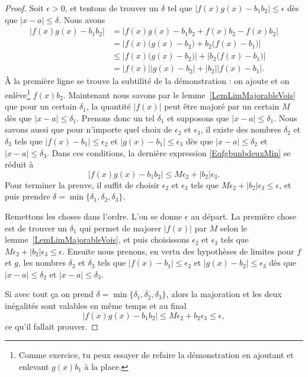 \begin{proof}
	Soit $\epsilon>0$, et tentons de trouver un $\delta$ tel que $| f(x)g(x)-b_1b_2 |\leq \epsilon$ dès que $| x-a |\leq \delta$. Nous avons
	\begin{equation}    \label{EqfgbunbdeuxMin}
		\begin{split}
			| f(x)g(x)-b_1b_2 |&=|  f(x)g(x)-b_1b_2 +f(x)b_2-f(x)b_2 |\\
			&=\left|   f(x)\big( g(x)-b_2 \big)+b_2\big( f(x)-b_1 \big)    \right|\\
			&\leq \left|  f(x)\big( g(x)-b_2 \big)  \right|+\left|  b_2\big( f(x)-b_1 \big)    \right|\\
			&= | f(x) | | g(x)-b_2  |+| b_2 | |f(x)-b_1 |.
		\end{split}
	\end{equation}
	À la première ligne se trouve la subtilité de la démonstration : on ajoute et on enlève\footnote{Comme exercice, tu peux essayer de refaire la démonstration en ajoutant et enlevant $g(x)b_1$ à la place.} $f(x)b_2$. Maintenant nous savons par le lemme~\ref{LemLimMajorableVois} que pour un certain $\delta_1$, la quantité $| f(x) |$ peut être majoré par un certain $M$ dès que $| x-a |\leq \delta_1$. Prenons donc un tel $\delta_1$ et supposons que $| x-a |\leq \delta_1$. Nous savons aussi que pour n'importe quel choix de $\epsilon_2$ et $\epsilon_3$, il existe des nombres $\delta_2$ et $\delta_3$ tels que $| f(x)-b_1 |\leq \epsilon_2$ et $| g(x)-b_1 |\leq \epsilon_3$ dès que $| x-a |\leq\delta_2$ et $| x-a |\leq\delta_3$. Dans ces conditions, la dernière expression \eqref{EqfgbunbdeuxMin} se réduit à
	\begin{equation}
		| f(x)g(x)-b_1b_2 |\leq M\epsilon_2+| b_2 |\epsilon_3.
	\end{equation}
	Pour terminer la preuve, il suffit de choisir $\epsilon_2$ et $\epsilon_3$ tels que $M\epsilon_2+| b_2 |\epsilon_3\leq\epsilon$, et puis prendre $\delta=\min\{ \delta_1,\delta_2,\delta_3 \}$.

	Remettons les choses dans l'ordre. L'on se donne $\epsilon$ au départ. La première chose est de trouver un $\delta_1$ qui permet de majorer $|f(x)|$ par $M$ selon le lemme~\ref{LemLimMajorableVois}, et puis choisissons $\epsilon_2$ et $\epsilon_3$ tels que $M\epsilon_2+| b_2 |\epsilon_3\leq\epsilon$. Ensuite nous prenons, en vertu des hypothèses de limites pour $f$ et $g$, les nombres $\delta_2$ et $\delta_3$ tels que $| f(x)-b_1 |\leq \epsilon_2$ et $| g(x)-b_2 |\leq \epsilon_3$ dès que $| x-a |\leq \delta_2$ et $| x-a |\leq \delta_3$.

	Si avec tout ça on prend $\delta=\min\{ \delta_1,\delta_2,\delta_3 \}$, alors la majoration et les deux inégalités sont valables en même temps et au final
	\[
		| f(x)g(x)-b_1b_2 |\leq M\epsilon_2+b_2\epsilon_3\leq \epsilon,
	\]
	ce qu'il fallait prouver.

\end{proof}

